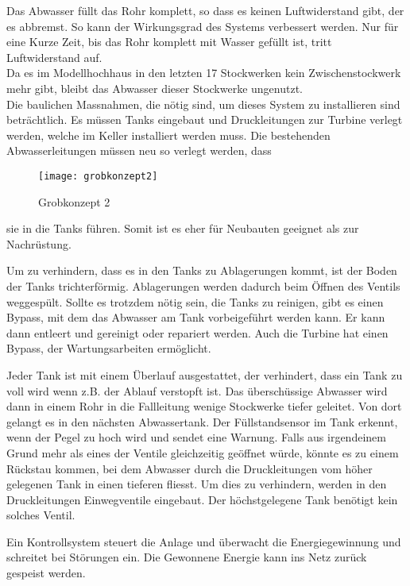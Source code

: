 Das Abwasser füllt das Rohr komplett, so dass es keinen Luftwiderstand gibt, der es abbremst. So kann der Wirkungsgrad des Systems verbessert werden. Nur für eine Kurze Zeit, bis das Rohr komplett mit Wasser gefüllt ist, tritt Luftwiderstand auf.\\
Da es im Modellhochhaus in den letzten 17 Stockwerken kein Zwischenstockwerk mehr gibt, bleibt das Abwasser dieser Stockwerke ungenutzt.\\
Die baulichen Massnahmen, die nötig sind, um dieses System zu installieren sind beträchtlich. Es müssen Tanks eingebaut und Druckleitungen zur Turbine verlegt werden, welche im Keller installiert werden muss. Die bestehenden Abwasserleitungen müssen neu so verlegt werden, dass

\begin{wrapfigure}{r}{0.5\textwidth}
  \begin{center}
    \texttt{[image: grobkonzept2]}
  \end{center}
  \caption{Grobkonzept 2}
\end{wrapfigure}


sie in die Tanks führen. Somit ist es eher für Neubauten geeignet als zur Nachrüstung.

Um zu verhindern, dass es in den Tanks zu Ablagerungen kommt, ist der Boden der Tanks trichterförmig. Ablagerungen werden dadurch beim Öffnen des Ventils weggespült. Sollte es trotzdem nötig sein, die Tanks zu reinigen, gibt es einen Bypass, mit dem das Abwasser am Tank vorbeigeführt werden kann.
Er kann dann entleert und gereinigt oder repariert werden. Auch die Turbine hat einen Bypass, der Wartungsarbeiten ermöglicht.

Jeder Tank ist mit einem Überlauf ausgestattet, der verhindert, dass ein Tank zu voll wird wenn z.B. der Ablauf verstopft ist. Das überschüssige Abwasser wird dann in einem Rohr in die Fallleitung wenige Stockwerke tiefer geleitet. Von dort gelangt es in den nächsten Abwassertank. Der Füllstandsensor im Tank erkennt, wenn der Pegel zu hoch wird und sendet eine Warnung.
Falls aus irgendeinem Grund mehr als eines der Ventile gleichzeitig geöffnet würde, könnte es zu einem Rückstau kommen, bei dem Abwasser durch die Druckleitungen vom höher gelegenen Tank in einen tieferen fliesst. Um dies zu verhindern, werden in den Druckleitungen Einwegventile eingebaut. Der höchstgelegene Tank benötigt kein solches Ventil. 

Ein Kontrollsystem steuert die Anlage und überwacht die Energiegewinnung und schreitet bei Störungen ein. Die Gewonnene Energie kann ins Netz zurück gespeist werden.

